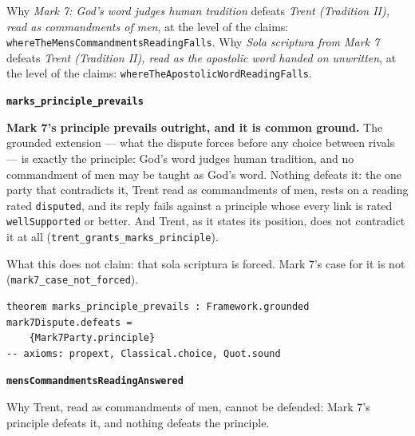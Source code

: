 \documentclass[11pt]{article}
\begin{document}
\noindent Why \emph{Mark 7: God’s word judges human tradition} defeats \emph{Trent (Tradition II), read as commandments of men}, at the level of the claims: \texttt{where\allowbreak{}The\allowbreak{}Mens\allowbreak{}Commandments\allowbreak{}Reading\allowbreak{}Falls}.
\noindent Why \emph{Sola scriptura from Mark 7} defeats \emph{Trent (Tradition II), read as the apostolic word handed on unwritten}, at the level of the claims: \texttt{where\allowbreak{}The\allowbreak{}Apostolic\allowbreak{}Word\allowbreak{}Reading\allowbreak{}Falls}.
\par\medskip\noindent\textbf{\texttt{marks\_\allowbreak{}principle\_\allowbreak{}prevails}}\par\nobreak\noindent
\textbf{Mark 7’s principle prevails outright, and it is common ground.} The grounded extension — what the dispute forces before any choice between rivals — is exactly the principle: God’s word judges human tradition, and no commandment of men may be taught as God’s word. Nothing defeats it: the one party that contradicts it, Trent read as commandments of men, rests on a reading rated \texttt{disputed}, and its reply fails against a principle whose every link is rated \texttt{well\allowbreak{}Supported} or better. And Trent, as it states its position, does not contradict it at all (\texttt{trent\_\allowbreak{}grants\_\allowbreak{}marks\_\allowbreak{}principle}).

What this does not claim: that sola scriptura is forced. Mark 7’s case for it is not (\texttt{mark7\_\allowbreak{}case\_\allowbreak{}not\_\allowbreak{}forced}).

{\small\begin{verbatim}
theorem marks_principle_prevails : Framework.grounded mark7Dispute.defeats =
    {Mark7Party.principle}
-- axioms: propext, Classical.choice, Quot.sound
\end{verbatim}}
\par\medskip\noindent\textbf{\texttt{mens\allowbreak{}Commandments\allowbreak{}Reading\allowbreak{}Answered}}\par\nobreak\noindent
Why Trent, read as commandments of men, cannot be defended: Mark 7’s principle defeats it, and nothing defeats the principle.
\end{document}
